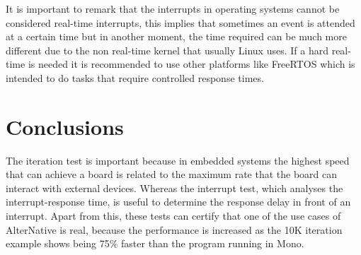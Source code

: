 It is important to remark that the interrupts in operating systems cannot be considered real-time interrupts, this implies that sometimes an event is attended at a certain time but in another moment, the time required can be much more different due to the non real-time kernel that usually Linux uses. If a hard real-time is needed it is recommended to use other platforms like FreeRTOS which is intended to do tasks that require controlled response times.

\section{Conclusions}\label{S:PerformanceTests-Conclusions}
The iteration test is important because in embedded systems the highest speed that can achieve a board is related to the maximum rate that the board can interact with external devices. Whereas the interrupt test, which analyses the interrupt-response time, is useful to determine the response delay in front of an interrupt. Apart from this, these tests can certify that one of the use cases of AlterNative is real, because the performance is increased as the 10K iteration example shows being 75\% faster than the program running in Mono.